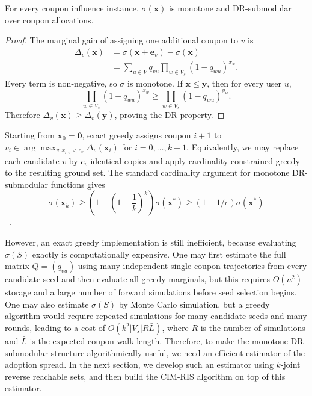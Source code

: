 \documentclass[sigconf,balance=false]{acmart}
\newcommand{\CIMRIS}{\textsc{CIM-RIS}}
\begin{document}
\begin{theorem}
\label{thm:monosub}
For every coupon influence instance, $\sigma(\bm{x})$ is monotone and
DR-submodular over coupon allocations.
\end{theorem}

\begin{proof}
The marginal gain of assigning one additional coupon to $v$ is
\begin{align*}
  \Delta_v(\bm{x})
  &=\sigma(\bm{x}+\bm{e}_v)-\sigma(\bm{x})\\
  &=\sum_{u\in V}q_{vu}
    \prod_{w\in V_s}(1-q_{wu})^{x_w}.
\end{align*}
Every term is non-negative, so $\sigma$ is monotone.
If $\bm{x}\leq\bm{y}$, then for every user $u$,
\[
  \prod_{w\in V_s}(1-q_{wu})^{x_w}
  \geq
  \prod_{w\in V_s}(1-q_{wu})^{y_w}.
\]
Therefore $\Delta_v(\bm{x})\geq\Delta_v(\bm{y})$, proving the DR
property.
\end{proof}

Starting from $\bm{x}_0=\bm{0}$, exact greedy assigns coupon $i+1$ to
$v_i\in\arg\max_{v:x_{i,v}<c_v}\Delta_v(\bm{x}_i)$ for
$i=0,\ldots,k-1$.
Equivalently, we may replace each candidate $v$ by $c_v$ identical copies
and apply cardinality-constrained greedy to the resulting ground set.
The standard cardinality argument for monotone DR-submodular functions
gives
\[
  \sigma(\bm{x}_k)
  \geq \left(1-\left(1-\frac{1}{k}\right)^k\right)\sigma(\bm{x}^*)
  \geq (1-1/e)\sigma(\bm{x}^*)
\]
~\cite{nemhauser1978analysis}.

However, an exact greedy implementation is still inefficient, because
evaluating $\sigma(S)$ exactly is computationally expensive.
One may first estimate the full matrix $Q=(q_{vu})$ using many independent
single-coupon trajectories from every candidate seed and then evaluate all
greedy marginals, but this requires $O(n^2)$ storage and a large number of
forward simulations before seed selection begins.
One may also estimate $\sigma(S)$ by Monte Carlo simulation, but a
greedy algorithm would require repeated simulations for many candidate
seeds and many rounds, leading to a cost of
$O(k^2 |V_s|R\bar{L})$, where $R$ is the number of simulations and
$\bar{L}$ is the expected coupon-walk length.
Therefore, to make the monotone DR-submodular structure algorithmically
useful, we need an efficient estimator of the adoption spread.
In the next section, we develop such an estimator using $k$-joint
reverse reachable sets, and then build the \CIMRIS{} algorithm on top of
this estimator.
\end{document}
